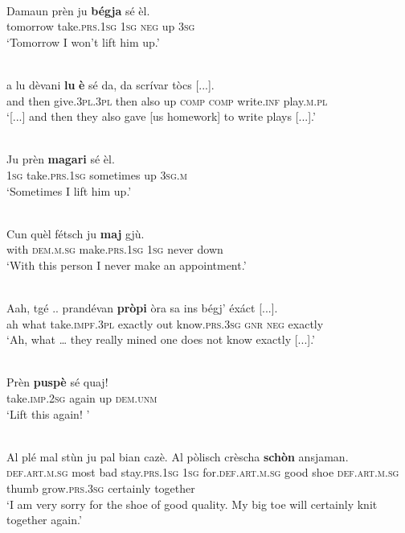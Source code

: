 \ea\label{ex:pv:3}
\\
\gll   Damaun prèn ju \textbf{bégja} sé èl.\\
     tomorrow take.\textsc{prs.1sg} \textsc{1sg} \textsc{neg} up \textsc{3sg}\\
\glt `Tomorrow I won’t lift him up.'
\z

\ea\label{ex:pv:4}
\\
	\gll    [...] a lu dèvani \textbf{lu} \textbf{è} sé da, da scrívar tòcs [...].\\
{} and then give.\textsc{3pl.3pl} then also up \textsc{comp} \textsc{comp} write.\textsc{inf} play.\textsc{m.pl}\\
\glt `[...] and then they also gave [us homework] to write plays [...].'
\z

\ea
\label{ex:pv:5}
\\
\gll  Ju prèn \textbf{magari} sé èl.  \\
\textsc{1sg} take.\textsc{prs.1sg} sometimes up \textsc{3sg.m}\\
\glt `Sometimes I lift him up.'
\z

\ea
\label{ex:pv:6}
\\
\gll  Cun quèl fétsch ju \textbf{maj} gjù.  \\
with \textsc{dem.m.sg} make.\textsc{prs.1sg} \textsc{1sg} never down\\
\glt `With this person I never make an appointment.'
\z

\ea
\label{ex:pv:7}
\\
\gll   Aah, tgé .. prandévan \textbf{pròpi} òra sa ins bégj' éxáct [...]. \\
ah what {} take.\textsc{impf.3pl} exactly out know.\textsc{prs.3sg} \textsc{gnr} \textsc{neg} exactly\\
\glt `Ah, what … they really mined one does not know exactly [...].'
\z

\ea
\label{ex:pv:8}
\\
\gll  Prèn \textbf{puspè} sé quaj! \\
take.\textsc{imp.2sg} again up \textsc{dem.unm}  \\
\glt `Lift this again! '
\z

\ea
\label{ex:pv:9}
 {\citealt[51]{Berther1998}}\\
\gll  Al plé mal stùn ju pal bian cazè. Al pòlisch crèscha \textbf{schòn} ansjaman.\\
     \textsc{def.art.m.sg}  most bad stay.\textsc{prs.1sg}  \textsc{1sg} for.\textsc{def.art.m.sg} good shoe \textsc{def.art.m.sg} thumb grow.\textsc{prs.3sg}  certainly together\\
\glt `I am very sorry for the shoe of good quality. My big toe will certainly knit together again.'
\z


